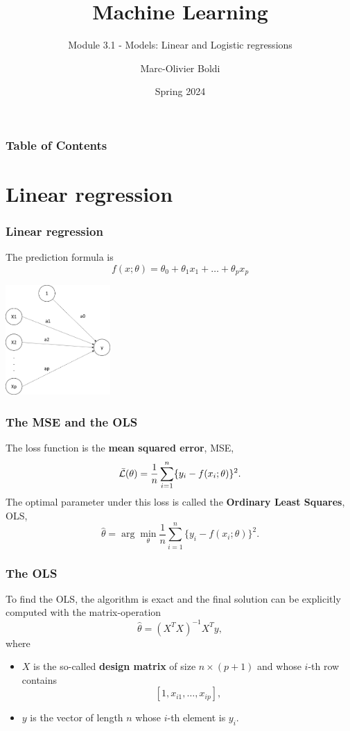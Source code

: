 
\title{Machine Learning}
\subtitle{Module 3.1 - Models: Linear and Logistic regressions}
\author[MOB]{Marc-Olivier Boldi}
\date[Spring 2024]{Spring 2024}

\begin{frame}
  \titlepage
\end{frame}
\begin{frame}
\frametitle{Table of Contents}
	\tableofcontents
\end{frame}
\section{Linear regression}
\begin{frame}
\frametitle{Linear regression}
The prediction formula is 
$$
f(x;\theta) = \theta_0 + \theta_1 x_{1} + \ldots + \theta_p x_{p}
$$
\begin{center}
\includegraphics[width=4cm]{../../Graphs/LinReg_Network.png}
\end{center}
\end{frame}
\begin{frame}
\frametitle{The MSE and the OLS}
The loss function is the {\bf mean squared error}, MSE,
$$
\bar{\cal L}(\theta) = \frac{1}{n} \sum_{i=1}^n \{y_i - f(x_i;\theta)\}^2.
$$
The optimal parameter under this loss is called the {\bf Ordinary Least Squares}, OLS,
$$
\hat{\theta} = \arg\min_{\theta} \frac{1}{n} \sum_{i=1}^n \{y_i - f(x_i;\theta)\}^2.
$$
\end{frame}
\begin{frame}
\frametitle{The OLS}
To find the OLS, the algorithm is exact and the final solution can be explicitly computed with the matrix-operation
$$
\hat{\theta} = (X^TX)^{-1} X^T y,
$$ 
where
\begin{itemize}
\item $X$ is the so-called {\bf design matrix} of size $n\times (p+1)$ and whose $i$-th row contains 
$$
[1,x_{i1},\ldots,x_{ip}],
$$
\item $y$ is the vector of length $n$ whose $i$-th element is $y_i$.
\end{itemize}
\end{frame}
